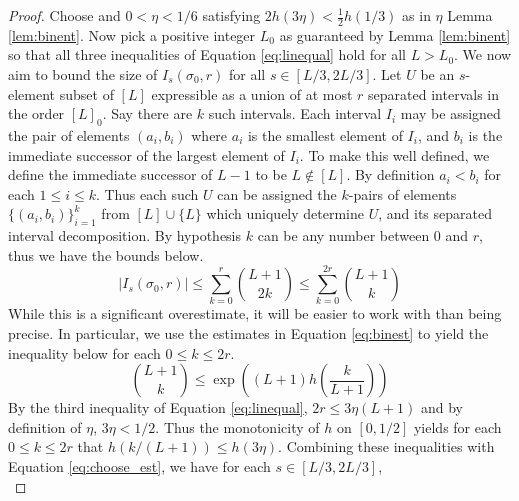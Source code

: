\documentclass[10pt,a4paper]{amsart}
\begin{document}
\begin{proof}
Choose and $0 < \eta < 1/6$ satisfying $2h(3\eta) < \frac{1}{2}h(1/3)$ as in $\eta$ Lemma \ref{lem:binent}.  Now pick a positive integer $L_{0}$ as guaranteed by Lemma \ref{lem:binent} so that all three inequalities of Equation \ref{eq:linequal} hold for all $L > L_{0}$.  We now aim to bound the size of $I_{s}(\sigma_{0},r)$ for all $s \in [L/3, 2L/3]$. 
 Let $U$ be an $s$-element subset of $[L]$ expressible as a union of at most $r$ separated intervals in the order $[L]_{0}$.  Say there are $k$ such intervals.  Each interval $I_{i}$ may be assigned the pair of elements $(a_{i},b_{i})$ where $a_{i}$ is the smallest element of $I_{i}$, and $b_{i}$ is the immediate successor of the largest element of $I_{i}$.  To make this well defined, we define the immediate successor of $L-1$ to be $L \notin [L]$.  By definition $a_{i} < b_{i}$ for each $1 \leq i \leq k$.  Thus each such $U$ can be assigned the $k$-pairs of elements $\{(a_{i},b_{i})\}_{i=1}^{k}$ from $[L]\cup\{L\}$ which uniquely determine $U$, and its separated interval decomposition.  By hypothesis $k$ can be any number between $0$ and $r$, thus we have the bounds below.  
\begin{equation}\label{eq:choose_est}
|I_{s}(\sigma_{0},r)| \leq \sum_{k = 0}^{r} \binom{L+1}{2k} \leq \sum_{k=0}^{2r} \binom{L+1}{k}
\end{equation}
While this is a significant overestimate, it will be easier to work with than being precise.  In particular, we use the estimates in Equation \ref{eq:binest} to yield the inequality below for each $0 \leq k \leq 2r$.  
\begin{equation*}
\binom{L+1}{k} \leq \exp\left((L+1)h\left(\frac{k}{L+1}\right)\right)
\end{equation*}
By the third inequality of Equation \ref{eq:linequal}, $2r \leq 3\eta(L+1)$ and by definition of $\eta$, $3\eta < 1/2$.  Thus the monotonicity of $h$ on $[0,1/2]$ yields for each $0 \leq k \leq 2r$ that $h(k/(L+1)) \leq h(3\eta)$.  Combining these inequalities with Equation \ref{eq:choose_est}, we have for each $s \in [L/3,2L/3]$,
\begin{equation*}

\end{equation*}
\end{proof}
\end{document}
